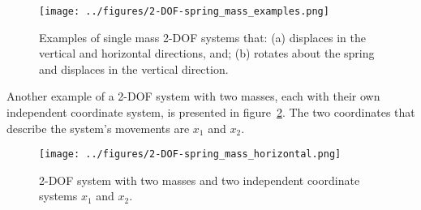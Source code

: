 \documentclass[12pt,letter]{article}
\begin{document}
	\begin{figure}[H]
		\centering
		\texttt{[image: ../figures/2-DOF-spring\_mass\_examples.png]}
		\caption{Examples of single mass 2-DOF systems that: (a) displaces in the vertical and horizontal directions, and; (b) rotates about the spring and displaces in the vertical direction. }
		\label{fig:2-DOF-spring_mass_examples}
	\end{figure}
	
	Another example of a 2-DOF system with two masses, each with their own independent coordinate system, is presented in figure~\ref{fig:2-DOF-spring_mass_horizontal}. The two coordinates that describe the system's movements are $x_1$ and $x_2$.
	
	\begin{figure}[H]
		\centering
		\texttt{[image: ../figures/2-DOF-spring\_mass\_horizontal.png]}
		\caption{2-DOF system with two masses and two independent coordinate systems $x_1$ and $x_2$.}
		\label{fig:2-DOF-spring_mass_horizontal}
	\end{figure}
	
\end{document}
